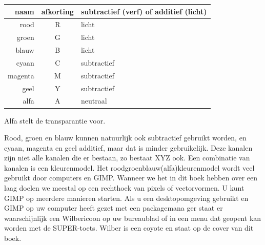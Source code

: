 \documentclass[11pt,a5paper,twoside]{book}
\begin{document}
  \begin{longtabu}{r|c|l}
   naam   &afkorting&subtractief (verf) of additief (licht)\\\hline
   rood   &    R    & licht\\
   groen  &    G    & licht\\
   blauw  &    B    & licht\\
   \hline
   cyaan  &    C    &subtractief\\
   magenta&    M    &subtractief\\
   geel   &    Y    &subtractief\\
   \hline
   alfa   &    A    &neutraal\\
  \end{longtabu}

  Alfa stelt de transparantie voor.

  Rood, groen en blauw kunnen natuurlijk ook subtractief gebruikt worden,
   en cyaan, magenta en geel additief, maar dat is minder gebruikelijk.
  Deze kanalen zijn niet alle kanalen die er bestaan, zo bestaat XYZ ook.
  Een combinatie van kanalen is een kleurenmodel.
  Het roodgroenblauw(alfa)kleurenmodel wordt veel gebruikt door computers en GIMP.
  Wanneer we het in dit boek hebben over een laag doelen we meestal op een rechthoek
   van pixels of vectorvormen.
  U kunt GIMP op meerdere manieren starten. Als u een desktopomgeving
   gebruikt en GIMP op uw computer heeft gezet met een packagemana%
   ger staat er waarschijnlijk een Wilbericoon op uw bureaublad of
   in een menu dat geopent kan worden met de SUPER-toets. Wilber is
   een coyote en staat op de cover van dit boek.
\end{document}
